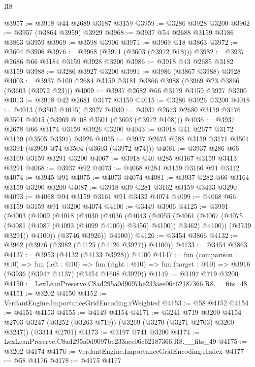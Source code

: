 \begin{lexlean}{R8}
\begin{coremodule}
@3957 := @3918 @44 @2689 @3187 @3159
@3959 := @3286 @3928 @3200
@3962 := @3957 (@3864 @3959) @3929
@3968 := @3937 @54 @2688 @3159 @3186 @3863 @3959
@3969 := @3598 @3906
@3971 := @3969 @18 @3863
@3972 := @3604 @3906
@3976 := @3968 (@3971 (@3603 (@3972 @18)))
@3982 := @3937 @2686 @66 @3184 @3159 @3928 @3200
@3986 := @3918 @43 @2685 @3182 @3159
@3988 := @3286 @3927 @3200
@3991 := @3986 (@3867 @3988) @3928
@4003 := @3937 @100 @2684 @3159 @3181 @3866 @3988 (@3969 @23 @3866 (@3603 (@3972 @23)))
@4009 := @3937 @2682 @66 @3179 @3159 @3927 @3200
@4013 := @3918 @42 @2681 @3177 @3159
@4015 := @3286 @3926 @3200
@4018 := @4013 (@3502 @4015) @3927
@4030 := @3937 @2673 @2680 @3159 @3176 @3501 @4015 (@3969 @108 @3501 (@3603 (@3972 @108)))
@4036 := @3937 @2678 @66 @3174 @3159 @3926 @3200
@4043 := @3918 @41 @2677 @3172 @3159 (@3505 @3391) @3926
@4055 := @3937 @2675 @288 @3159 @3171 @3504 @3391 (@3969 @74 @3504 (@3603 (@3972 @74)))
@4061 := @3937 @286 @66 @3169 @3159 @3291 @3200
@4067 := @3918 @40 @285 @3167 @3159 @3413 @3291
@4068 := @3937 @92
@4073 := @4068 @284 @3159 @3166 @91 @3412
@4074 := @3945 @91
@4075 := @4073 @4074
@4081 := @3937 @282 @66 @3164 @3159 @3290 @3200
@4087 := @3918 @39 @281 @3162 @3159 @3433 @3290
@4093 := @4068 @94 @3159 @3161 @91 @3432 @4074
@4099 := @4068 @66 @3159 @3159 @91 @3200 @4074
@4100 := @3449 @3906
@4125 := @3991
    (@4003
      (@4009
        (@4018
          (@4030
            (@4036
              (@4043
                (@4055
                  (@4061
                    (@4067 (@4075 (@4081 (@4087 (@4093 (@4099 @4100)) @3456) @4100)) @3462)
                    @4100))
                (@3739 @3291))
              @4100))
          (@3746 @3926))
        @4100))
@4126 := @3454 @3866
@4132 := @3962 (@3976 (@3982 (@4125 (@4126 @3927)) @4100))
@4133 := @3454 @3863
@4137 := @3953 (@4132 (@4133 @3928)) @4100
@4147 := fun (comparison : @10) =>
  fun (left : @10) =>
  fun (right : @10) => fun (target : @10) => @3916 (@3936 (@3947 @4137) (@3454 @1608 @3929))
@4149 := @3197 @719 @3200
@4150 := LexLeanPreserve.C8ad295a0d9097be233aee06c62187366.R8.__fits_48
@4151 := @3202 @4150
@4152 := VerdantEngine.ImportanceGridEncoding.rWeighted
@4153 := @58 @4152
@4154 := @4151 @4153
@4155 := @4149 @4154
@4171 := @3241
    @719
    @3200
    @4154
    @2703
    @3247
    (@3252 (@3263 @719))
    (@3269 (@3270 (@3271 @2703) @3200 @3247))
    (@3314 @2701)
@4173 := @3197 @741 @3200
@4174 := LexLeanPreserve.C8ad295a0d9097be233aee06c62187366.R8.__fits_49
@4175 := @3202 @4174
@4176 := VerdantEngine.ImportanceGridEncoding.rIndex
@4177 := @58 @4176
@4178 := @4175 @4177

\end{coremodule}
\end{lexlean}
